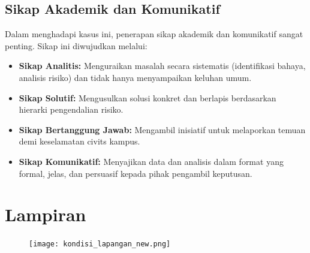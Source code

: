\documentclass[a4paper, 12pt]{article}
\begin{document}
\subsection{Sikap Akademik dan Komunikatif}
Dalam menghadapi kasus ini, penerapan sikap akademik dan komunikatif sangat penting. Sikap ini diwujudkan melalui:
\begin{itemize}
    \item \textbf{Sikap Analitis:} Menguraikan masalah secara sistematis (identifikasi bahaya, analisis risiko) dan tidak hanya menyampaikan keluhan umum.
    \item \textbf{Sikap Solutif:} Mengusulkan solusi konkret dan berlapis berdasarkan hierarki pengendalian risiko.
    \item \textbf{Sikap Bertanggung Jawab:} Mengambil inisiatif untuk melaporkan temuan demi keselamatan civits kampus.
    \item \textbf{Sikap Komunikatif:} Menyajikan data dan analisis dalam format yang formal, jelas, dan persuasif kepada pihak pengambil keputusan.
\end{itemize}
\section{Lampiran}
\begin{figure}[htbp] 
        \centering
        \texttt{[image: kondisi\_lapangan\_new.png]}
        \label{fig:kondisi}
\end{figure}

\end{document}
